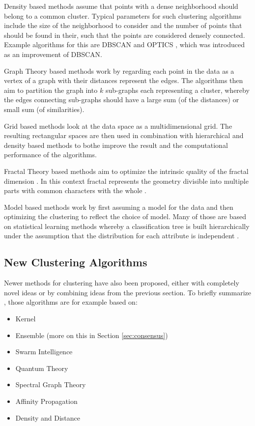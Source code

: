 \documentclass[
	a4paper,
	english,
	twoside,
	openright,               
	11pt                            
	]{report}
\begin{document}
Density based methods assume that points with a dense neighborhood should belong to a common cluster. Typical parameters for such clustering algorithms include the size of the neighborhood to consider and the number of points that should be found in their, such that the points are considered densely connected. Example algorithms for this are DBSCAN \cite{10.5555/3001460.3001507} and OPTICS \cite{10.1145/304181.304187}, which was introduced as an improvement of DBSCAN.

Graph Theory based methods work by regarding each point in the data as a vertex of a graph with their distances represent the edges. The algorithms then aim to partition the graph into $k$ sub-graphs each representing a cluster, whereby the edges connecting sub-graphs should have a large sum (of the distances) or small sum (of similarities).

Grid based methods look at the data space as a multidimensional grid. The resulting rectangular spaces are then used in combination with hierarchical and density based methods to bothe improve the result and the computational performance of the algorithms.

Fractal Theory based methods aim to optimize the intrinsic quality of the fractal dimension \cite{surveyclustering}. In this context fractal represents the geometry divisible into multiple parts with common characters with the whole \cite{surveyclustering}.

Model based methods work by first assuming a model for the data and then optimizing the clustering to reflect the choice of model. Many of those are based on statistical learning methods whereby a classification tree is built hierarchically under the assumption that the distribution for each attribute is independent \cite{surveyclustering}.

\subsection{New Clustering Algorithms}

Newer methods for clustering have also been proposed, either with completely novel ideas or by combining ideas from the previous section. To briefly summarize \cite{surveyclustering}, those algorithms are for example based on:

\begin{itemize}
  \item Kernel
  \item Ensemble (more on this in Section \ref{sec:consensus})
  \item Swarm Intelligence
  \item Quantum Theory
  \item Spectral Graph Theory
  \item Affinity Propagation
  \item Density and Distance
\end{itemize}
\end{document}

